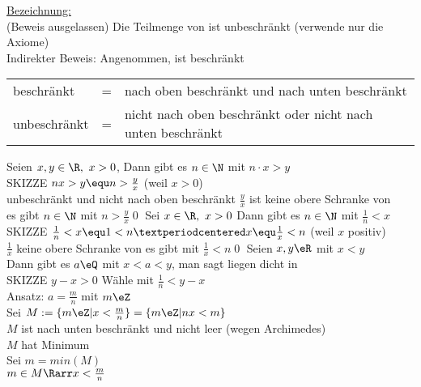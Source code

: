 \underline{Bezeichnung:} \R\\
(Beweis ausgelassen)
%
\Satz
Die Teilmenge \N{} von \R{} ist unbeschränkt
\bew
(verwende nur die Axiome)\\
Indirekter Beweis: Angenommen, \N{} ist beschränkt\\
\begin{tabular}{lcl}
beschränkt &=& nach oben beschränkt und nach unten beschränkt\\
unbeschränkt &=& nicht nach oben beschränkt oder nicht nach unten beschränkt
\end{tabular}
%
Seien $x,y\in\R,\ x>0$, Dann gibt es $n\in\N$ mit $n·x>y$\\
SKIZZE %
%
\bew
$nx>y \equ n>\frac{y}{x}$ (weil $x>0$)\\
\N{} unbeschränkt und nicht nach oben beschränkt \Rarr{} $\frac{y}{x}$ ist keine obere Schranke von \N\\
\Rarr{} es gibt $n\in\N$ mit $n>\frac{y}{x}$\qed
%
Sei $x\in\R,\ x>0$ Dann gibt es $n\in\N$ mit $\frac{1}{n}<x$\\
SKIZZE %
\bew
$\frac{1}{n}<x \equ 1<n·x \equ \frac{1}{x}<n$ (weil $x$ positiv)\\
$\frac{1}{x}$ keine obere Schranke von \N{} \Rarr{} es gibt \nN{} mit $\frac{1}{x}<n$\qed
%
\Satz
Seien $x,y\eR$ mit $x<y$\\
Dann gibt es $a\eQ$ mit $x<a<y$, man sagt \Q{} liegen dicht in \R\\
SKIZZE %
\bew
$y-x>0$ Wähle \nN{} mit $\frac{1}{n}<y-x$\\
Ansatz: $a=\frac{m}{n}$ mit $m\eZ$\\
Sei $M:=\{m\eZ|x<\frac{m}{n}\}=\{m\eZ|nx<m\}$\\
$M$ ist nach unten beschränkt und nicht leer (wegen Archimedes)\\
$M$ hat Minimum\\
Sei $m=min(M)$\\
$m\in M \Rarr x<\frac{m}{n}$\\
